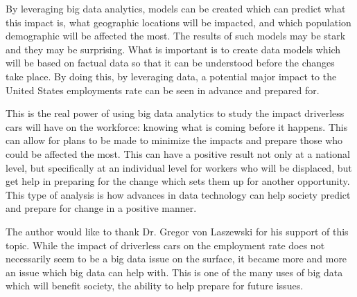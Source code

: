 \documentclass[sigconf]{acmart}
\begin{document}
By leveraging big data analytics, models can be created which can predict what 
this impact is, what geographic locations will be impacted, and which 
population demographic will be affected the most. The results of such models 
may be stark and they may be surprising.  What is important is to create data 
models which will be based on factual data so that it can be understood before 
the changes take place.  By doing this, by leveraging data, a potential major 
impact to the United States employments rate can be seen in advance and 
prepared for. 
 
This is the real power of using big data analytics to study the impact 
driverless cars will have on the workforce:  knowing what is coming before 
it happens.  This can allow for plans to be made to minimize the impacts and 
prepare those who could be affected the most.  This can have a positive result 
not only at a national level, but specifically at an individual level for 
workers who will be displaced, but get help in preparing for the change which 
sets them up for another opportunity.  This type of analysis is how advances 
in data technology can help society predict and prepare for change in a 
positive manner.

\begin{acks}

  The author would like to thank Dr. Gregor von Laszewski for his
  support of this topic.  While the impact of driverless cars on the 
  employment rate does not necessarily seem to be a big data issue on
  the surface, it became more and more an issue which big data can 
  help with.  This is one of the many uses of big data which will benefit
  society, the ability to help prepare for future issues.

\end{acks}


 
\end{document}
